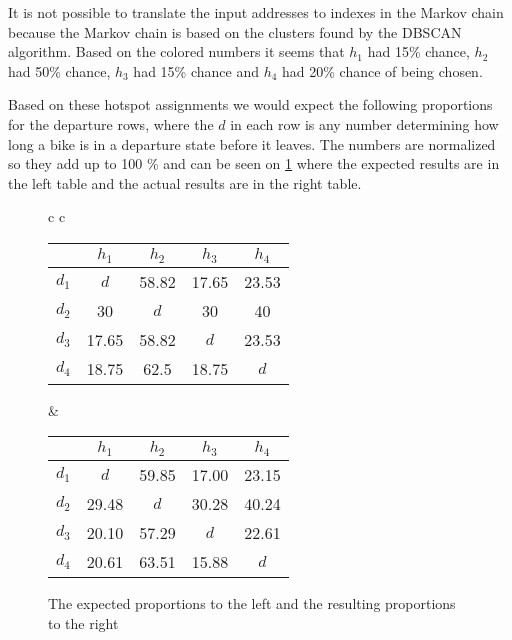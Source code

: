 It is not possible to translate the input addresses to indexes in the Markov chain because the Markov chain is based on the clusters found by the DBSCAN algorithm.
Based on the colored numbers it seems that $ h_1 $ had 15\% chance, $ h_2 $ had 50\% chance, $ h_3 $ had 15\% chance and $ h_4 $ had 20\% chance of being chosen.

Based on these hotspot assignments we would expect the following proportions for the departure rows, where the $ d $ in each row is any number determining how long a bike is in a departure state before it leaves.
The numbers are normalized so they add up to 100 \% and can be seen on \cref{uneven_results} where the expected results are in the left table and the actual results are in the right table.

\begin{figure}

\begin{tabular} {c c }

\begin{tabular}{ | c | c c c c |}
	\hline
	 & $ h_1 $ & $ h_2 $ & $ h_3 $ & $ h_4 $\\
	\hline
	$ d_1 $ & $ d $ & 58.82 & 17.65 & 23.53\\
	$ d_2 $ & 30 & $ d $ & 30 & 40\\
	$ d_3 $ & 17.65 & 58.82 & $ d $ & 23.53\\
	$ d_4 $ & 18.75 & 62.5 & 18.75 & $ d $\\
	\hline
\end{tabular}

&

\begin{tabular}{ | c | c c c c |}
	\hline
	& $ h_1 $ & $ h_2 $ & $ h_3 $ & $ h_4 $\\
	\hline
	$ d_1 $ & $ d $ & 59.85 & 17.00 & 23.15\\
	$ d_2 $ & 29.48 & $ d $ & 30.28 & 40.24\\
	$ d_3 $ & 20.10 & 57.29 & $ d $ & 22.61 \\
	$ d_4 $ & 20.61 & 63.51 & 15.88 & $ d $\\
	\hline
\end{tabular}
\end{tabular}
\caption{The expected proportions to the left and the resulting proportions to the right}\label{uneven_results}
\end{figure}

